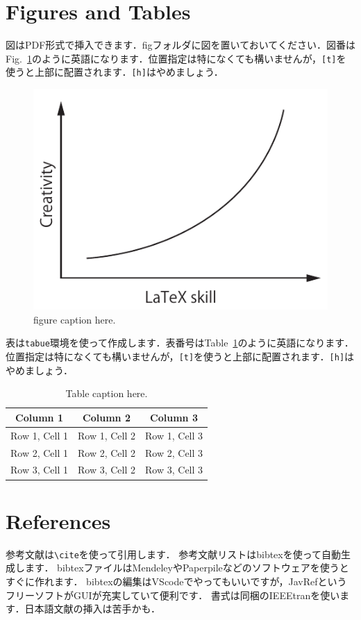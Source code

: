 \documentclass[a4j,10pt,english]{jsarticle}
\begin{document}
\section{Figures and Tables}
図はPDF形式で挿入できます．figフォルダに図を置いておいてください．図番はFig.~\ref{fig:sample}のように英語になります．位置指定は特になくても構いませんが，{\tt [t]}を使うと上部に配置されます．{\tt [h]}はやめましょう．
\begin{figure}[]
  \centering
  \includegraphics[scale = 1.0]{fig/sample.pdf}
  \caption{figure caption here.}
  \label{fig:sample}
\end{figure}

表は{\tt tabue}環境を使って作成します．表番号はTable~\ref{tab:sample}のように英語になります．位置指定は特になくても構いませんが，{\tt [t]}を使うと上部に配置されます．{\tt [h]}はやめましょう．
\begin{table}[]
  \caption{Table caption here.}
  \label{tab:sample}
  \centering
  \begin{tabular}{c|c|c}
    \textbf{Column 1} & \textbf{Column 2} & \textbf{Column 3} \\
    \hline
    Row 1, Cell 1 & Row 1, Cell 2 & Row 1, Cell 3 \\
    Row 2, Cell 1 & Row 2, Cell 2 & Row 2, Cell 3 \\
    Row 3, Cell 1 & Row 3, Cell 2 & Row 3, Cell 3 \\
  \end{tabular}  
\end{table}

\section{References}
参考文献は{\tt \textbackslash cite}を使って引用します\cite{kamimura22,Kamimura2022ASCC}．
参考文献リストはbibtexを使って自動生成します．
bibtexファイルはMendeleyやPaperpileなどのソフトウェアを使うとすぐに作れます．
bibtexの編集はVScodeでやってもいいですが，JavRefというフリーソフトがGUIが充実していて便利です．
書式は同梱のIEEEtranを使います．日本語文献の挿入は苦手かも．
\end{document}
